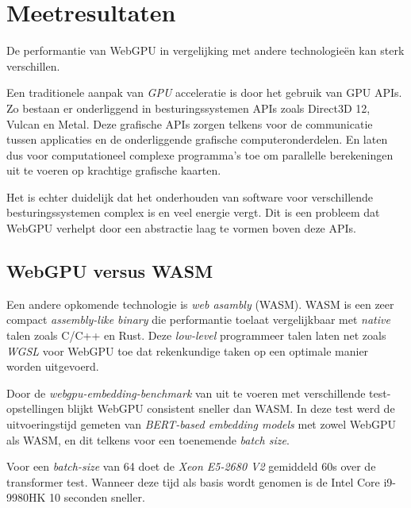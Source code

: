 \chapter{Meetresultaten}%
\label{ch:benchmarks}

De performantie van WebGPU in vergelijking met andere technologieën kan sterk verschillen. 

Een traditionele aanpak van \textit{GPU} acceleratie is door het gebruik van GPU APIs. Zo bestaan er onderliggend in besturingssystemen APIs zoals Direct3D 12, Vulcan en Metal. Deze grafische APIs zorgen telkens voor de communicatie tussen applicaties en de onderliggende grafische computeronderdelen. En laten dus voor computationeel complexe programma's toe om parallelle berekeningen uit te voeren op krachtige grafische kaarten.

\bigbreak{}

Het is echter duidelijk dat het onderhouden van software voor verschillende besturingssystemen complex is en veel energie vergt. Dit is een probleem dat WebGPU verhelpt door een abstractie laag te vormen boven deze APIs. \autocite{Wallez2023} 

\break{}

\section{WebGPU versus WASM}

Een andere opkomende technologie is  \textit{web asambly} (WASM). WASM is een zeer compact \textit{assembly-like binary} die performantie toelaat vergelijkbaar met \textit{native} talen zoals C/C++ en Rust. \autocite{Steiner2023} Deze \textit{low-level} programmeer talen laten net zoals \textit{WGSL} voor WebGPU toe dat rekenkundige taken op een optimale manier worden uitgevoerd.

\bigbreak{}



Door de \textit{webgpu-embedding-benchmark} van \textcite{Lochner2024} uit te voeren met verschillende test-opstellingen blijkt WebGPU consistent sneller dan WASM. In deze test werd de uitvoeringstijd gemeten van \textit{BERT-based embedding models} met zowel WebGPU als WASM, en dit telkens voor een toenemende \textit{batch size}.

\bigbreak{}

Voor een \textit{batch-size} van 64 doet de \textit{Xeon E5-2680 V2} gemiddeld 60s over de transformer test. Wanneer deze tijd als basis wordt genomen is de Intel Core i9-9980HK 10 seconden sneller.

